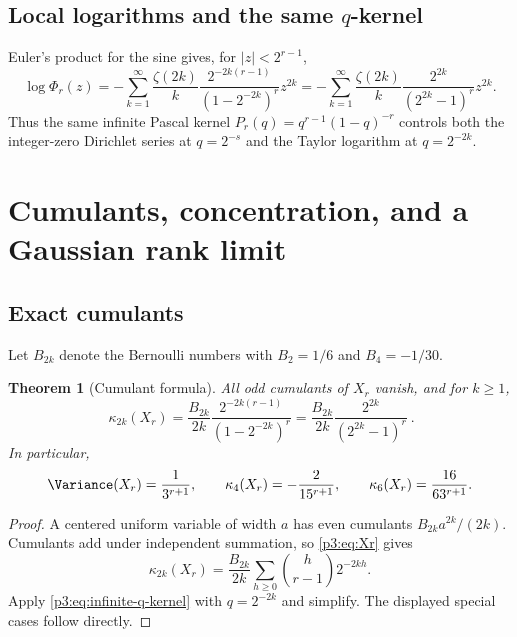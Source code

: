 \documentclass[11pt,oneside]{article}
\newtheorem{theorem}{Theorem}[section]
\theoremstyle{definition}
\theoremstyle{remark}
\begin{document}
\subsection{Local logarithms and the same \texorpdfstring{$q$}{q}-kernel}

Euler's product for the sine gives, for $|z|<2^{r-1}$,
\begin{equation}\label{p3:eq:log-phir}
 \log\Phi_r(z)
 =-\sum_{k=1}^{\infty}\frac{\zeta(2k)}{k}
   \frac{2^{-2k(r-1)}}{(1-2^{-2k})^r}z^{2k}
 =-\sum_{k=1}^{\infty}\frac{\zeta(2k)}{k}
   \frac{2^{2k}}{(2^{2k}-1)^r}z^{2k}.
\end{equation}
Thus the same infinite Pascal kernel $P_r(q)=q^{r-1}(1-q)^{-r}$ controls both the integer-zero Dirichlet series at $q=2^{-s}$ and the Taylor logarithm at $q=2^{-2k}$.

\section{Cumulants, concentration, and a Gaussian rank limit}\label{p3:sec:gaussian}

\subsection{Exact cumulants}

Let $B_{2k}$ denote the Bernoulli numbers with $B_2=1/6$ and $B_4=-1/30$.

\begin{theorem}[Cumulant formula]\label{p3:thm:cumulants}
All odd cumulants of $X_r$ vanish, and for $k\ge1$,
\begin{equation}\label{p3:eq:cumulant-r}
 \boxed{\ 
 \kappa_{2k}(X_r)
 =\frac{B_{2k}}{2k}
  \frac{2^{-2k(r-1)}}{(1-2^{-2k})^r}
 =\frac{B_{2k}}{2k}\frac{2^{2k}}{(2^{2k}-1)^r}
 \ }.
\end{equation}
In particular,
\begin{equation}\label{p3:eq:first-cumulants}
 \Variance(X_r)=\frac1{3^{r+1}},
 \qquad
 \kappa_4(X_r)=-\frac2{15^{r+1}},
 \qquad
 \kappa_6(X_r)=\frac{16}{63^{r+1}}.
\end{equation}
\end{theorem}

\begin{proof}
A centered uniform variable of width $a$ has even cumulants
$B_{2k}a^{2k}/(2k)$.  Cumulants add under independent summation, so \eqref{p3:eq:Xr} gives
\[
 \kappa_{2k}(X_r)
 =\frac{B_{2k}}{2k}
  \sum_{h\ge0}\binom h{r-1}2^{-2kh}.
\]
Apply \eqref{p3:eq:infinite-q-kernel} with $q=2^{-2k}$ and simplify.  The displayed special cases follow directly.
\end{proof}
\end{document}
